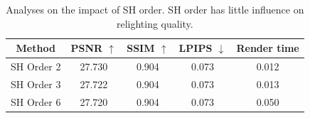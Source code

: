 \begin{table}[htbp]
  \centering
  \vspace{-0.1cm}
        \caption{Analyses on the impact of SH order. SH order has little influence on relighting quality.}
     \vspace{-0.3cm}
        \begin{tabular}{c|ccc|c}
    \hline
    Method&PSNR $\uparrow$& SSIM $\uparrow$& LPIPS $\downarrow$ &Render time\\
    \hline
     SH Order 2& {27.730} & 0.904 &0.073& {0.012}\\
    SH Order 3&  27.722 & 0.904& 0.073&0.013\\
    SH Order 6&  27.720 & 0.904 &0.073&0.050\\
    \hline
    \end{tabular}%
 \vspace{-0.6cm}
  \label{tab_sh}%
\end{table}%



